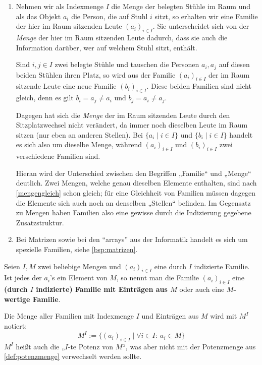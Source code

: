 \begin{bsp} \quad
    \begin{enumerate}
	\item Nehmen wir als Indexmenge $I$ die Menge der belegten Stühle im Raum und als das Objekt $a_i$ die Person, die auf Stuhl $i$ sitzt, so erhalten wir eine Familie der hier im Raum sitzenden Leute $(a_i)_{i\in I}$. Sie unterscheidet sich von der \textit{Menge} der hier im Raum sitzenden Leute dadurch, dass sie auch die Information darüber, wer auf welchem Stuhl sitzt, enthält.
	
	Sind $i,j\in I$ zwei belegte Stühle und tauschen die Personen $a_i,a_j$ auf diesen beiden Stühlen ihren Platz, so wird aus der Familie $(a_i)_{i\in I}$ der im Raum sitzende Leute eine neue Familie $(b_i)_{i\in I}$. Diese beiden Familien sind nicht gleich, denn es gilt $b_i=a_j\neq a_i$ und $b_j=a_i\neq a_j$.
	
	Dagegen hat sich die \emph{Menge} der im Raum sitzenden Leute durch den Sitzplatzwechsel nicht verändert, da immer noch dieselben Leute im Raum sitzen (nur eben an anderen Stellen). Bei $\{a_i\mid i\in I\}$ und $\{b_i \mid i\in I\}$ handelt es sich also um dieselbe Menge, während $(a_i)_{i\in I}$ und $(b_i)_{i\in I}$ zwei verschiedene Familien sind.
	
    Hieran wird der Unterschied zwischen den Begriffen „Familie“ und „Menge“ deutlich. Zwei Mengen, welche genau dieselben Elemente enthalten, sind nach \cref{mengengleich} schon gleich; für eine Gleichheit von Familien müssen dagegen die Elemente sich auch noch an denselben „Stellen“ befinden. Im Gegensatz zu Mengen haben Familien also eine gewisse durch die Indizierung gegebene Zusatzstruktur.
	\item Bei Matrizen sowie bei den ``arrays'' aus der Informatik handelt es sich um spezielle Familien, siehe \cref{bsp:matrizen}.
    \end{enumerate}
\end{bsp}


\begin{defin} \label{def:mengenpotenz}
    Seien $I,M$ zwei beliebige Mengen und $(a_i)_{i\in I}$ eine durch $I$ indizierte Familie. Ist jedes der $a_i$'s ein Element von $M$, so nennt man die Familie $(a_i)_{i\in I}$ eine \textbf{(durch $I$ indizierte) Familie mit Einträgen aus $M$} oder auch eine \textbf{$M$-wertige Familie}.
    
    Die Menge aller Familien mit Indexmenge $I$ und Einträgen aus $M$ wird mit $M^I$ notiert:
        \[ M^I := \{ (a_i)_{i\in I} \mid \forall i\in I:\ a_i \in M \} \]
    $M^I$ heißt auch die „$I$-te Potenz von $M$“, was aber nicht mit der Potenzmenge aus \cref{def:potenzmenge} verwechselt werden sollte.
\end{defin}


